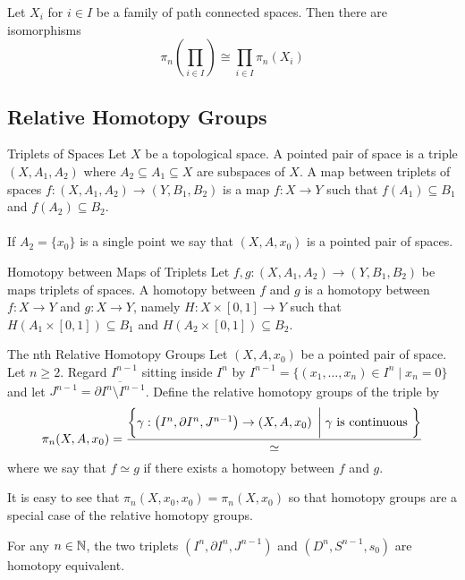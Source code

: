 \documentclass[a4paper]{article}
\begin{document}
\begin{prp}{}{} Let $X_i$ for $i\in I$ be a family of path connected spaces. Then there are isomorphisms $$\pi_n\left(\prod_{i\in I}\right)\cong\prod_{i\in I}\pi_n(X_i)$$
\end{prp}

\subsection{Relative Homotopy Groups}
\begin{defn}{Triplets of Spaces}{} Let $X$ be a topological space. A pointed pair of space is a triple $(X,A_1,A_2)$ where $A_2\subseteq A_1\subseteq X$ are subspaces of $X$. A map between triplets of spaces $f:(X,A_1,A_2)\to(Y,B_1,B_2)$ is a map $f:X\to Y$ such that $f(A_1)\subseteq B_1$ and $f(A_2)\subseteq B_2$. \\~\\
If $A_2=\{x_0\}$ is a single point we say that $(X,A,x_0)$ is a pointed pair of spaces. 
\end{defn}

\begin{defn}{Homotopy between Maps of Triplets}{} Let $f,g:(X,A_1,A_2)\to(Y,B_1,B_2)$ be maps triplets of spaces. A homotopy between $f$ and $g$ is a homotopy between $f:X\to Y$ and $g:X\to Y$, namely $H:X\times[0,1]\to Y$ such that $H(A_1\times[0,1])\subseteq B_1$ and $H(A_2\times[0,1])\subseteq B_2$. 
\end{defn}

\begin{defn}{The nth Relative Homotopy Groups}{} Let $(X,A,x_0)$ be a pointed pair of space. Let $n\geq 2$. Regard $I^{n-1}$ sitting inside $I^n$ by $I^{n-1}=\{(x_1,\dots,x_n)\in I^n\;|\;x_n=0\}$ and let $J^{n-1}=\overline{\partial I^n\setminus I^{n-1}}$. Define the relative homotopy groups of the triple by $$\pi_n(X,A,x_0)=\frac{\left\{\gamma:\left(I^n,\partial I^n,J^{n-1}\right)\to\left(X,A,x_0\right)\;\bigg{|}\;\gamma\text{ is continuous }\right\}}{\simeq}$$ where we say that $f\simeq g$ if there exists a homotopy between $f$ and $g$. 
\end{defn}

It is easy to see that $\pi_n(X,x_0,x_0)=\pi_n(X,x_0)$ so that homotopy groups are a special case of the relative homotopy groups. 

\begin{lmm}{}{} For any $n\in\mathbb{N}$, the two triplets $(I^n,\partial I^n,J^{n-1})$ and $(D^n,S^{n-1},s_0)$ are homotopy equivalent. 
\end{lmm}
\end{document}
